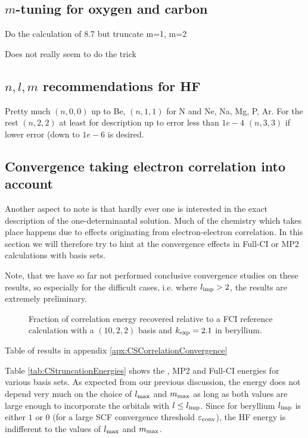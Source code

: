 \subsection{$m$-tuning for oxygen and carbon}
Do the calculation of 8.7 but truncate m=1, m=2

Does not really seem to do the trick

\subsection{$n,l,m$ recommendations for HF}
Pretty much $(n, 0, 0)$ up to Be, $(n, 1, 1)$ for N and Ne, Na, Mg, P, Ar.
For the rest $(n, 2, 2)$ at least for description up to error less than $1e-4$
$(n, 3, 3)$ if lower error (down to $1e-6$ is desired.

\subsection{Convergence taking electron correlation into account}



Another aspect to note is that hardly ever one is interested
in the exact description of the one-determinantal \HF solution.
Much of the chemistry which takes place happens due to effects originating
from electron-electron correlation.
In this section we will therefore try to hint at the convergence effects
in Full-CI or MP2 calculations with \CS basis sets.

Note, that we have so far not performed conclusive convergence studies
on these results, so especially for the difficult cases,
i.e. where $l_\text{imp} > 2$,
the results are extremely preliminary.

\begin{figure}
	\centering
	\caption{Fraction of correlation energy recovered
		relative to a FCI reference calculation with a $(10, 2, 2)$ \CS basis
		and $k_\text{exp} = 2.1$ in beryllium.}
	\label{fig:EccFciBe}
\end{figure}
Table of results in appendix \vref{apx:CSCorrelationConvergence}


Table \vref{tab:CStruncationEnergies} shows the \HF, MP2 and
Full-CI energies for various \CS basis sets.
As expected from our previous discussion,
the \HF energy does not depend very much on the choice
of $l_\text{max}$ and $m_\text{max}$ as long as both values
are large enough to incorporate the orbitals with $l \leq l_\text{imp}$.
Since for beryllium $l_\text{imp}$ is either $1$ or $0$
(for a large SCF convergence threshold $\varepsilon_\text{conv}$),
the HF energy is indifferent
to the values of $l_\text{max}$ and $m_\text{max}$.


